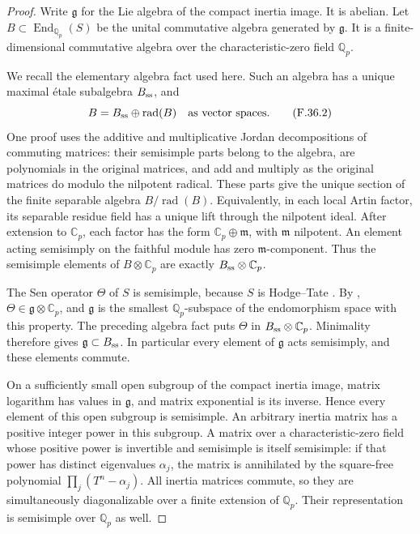 \documentclass[11pt]{article}
\begin{document}
\begin{proof}
Write \(\mathfrak g\) for the Lie algebra of
the compact inertia image. It is abelian.
Let \(B\subset\operatorname{End}_{\mathbb Q_p}(S)\)
be the unital commutative algebra generated by
\(\mathfrak g\). It is a finite-dimensional
commutative algebra over the characteristic-zero
field \(\mathbb Q_p\).

We recall the elementary algebra fact used
here. Such an algebra has a unique maximal
\'etale subalgebra \(B_{\rm ss}\), and
\[
           B=B_{\rm ss}\oplus\operatorname{rad}(B)
                         \quad\text{as vector spaces}.
                                                        \tag{F.36.2}
\]
One proof uses the additive and multiplicative
Jordan decompositions of commuting matrices:
their semisimple parts belong to the algebra,
are polynomials in the original matrices, and
add and multiply as the original matrices do
modulo the nilpotent radical. These parts
give the unique section of the finite separable
algebra \(B/\operatorname{rad}(B)\). Equivalently,
in each local Artin factor, its separable residue
field has a unique lift through the nilpotent
ideal. After extension to \(\mathbb C_p\),
each factor has the form
\(\mathbb C_p\oplus\mathfrak m\), with
\(\mathfrak m\) nilpotent. An element acting
semisimply on the faithful module has zero
\(\mathfrak m\)-component. Thus the semisimple
elements of \(B\otimes\mathbb C_p\) are exactly
\(B_{\rm ss}\otimes\mathbb C_p\).

The Sen operator \(\Theta\) of \(S\) is
semisimple, because \(S\) is Hodge--Tate
\citep[Section~2.7]{FF_Fontaine2004}.
By \citet[Theorem~3.1, \(d=0\)]{FF_Ohkubo2014},
\(\Theta\in\mathfrak g\otimes\mathbb C_p\),
and \(\mathfrak g\) is the smallest
\(\mathbb Q_p\)-subspace of the endomorphism
space with this property. The preceding
algebra fact puts \(\Theta\) in
\(B_{\rm ss}\otimes\mathbb C_p\). Minimality
therefore gives \(\mathfrak g\subset B_{\rm ss}\).
In particular every element of \(\mathfrak g\)
acts semisimply, and these elements commute.

On a sufficiently small open subgroup of
the compact inertia image, matrix logarithm
has values in \(\mathfrak g\), and matrix
exponential is its inverse. Hence every
element of this open subgroup is semisimple.
An arbitrary inertia matrix has a positive
integer power in this subgroup. A matrix
over a characteristic-zero field whose
positive power is invertible and semisimple
is itself semisimple: if that power has
distinct eigenvalues \(\alpha_j\), the
matrix is annihilated by the square-free
polynomial \(\prod_j(T^n-\alpha_j)\).
All inertia matrices commute, so they are
simultaneously diagonalizable over a finite
extension of \(\mathbb Q_p\). Their
representation is semisimple over
\(\mathbb Q_p\) as well.


\end{proof}
\end{document}
